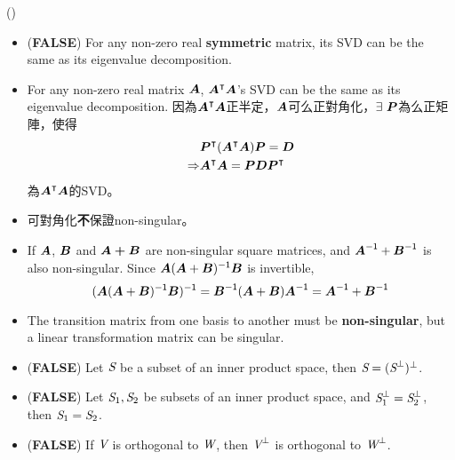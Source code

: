\item \begin{theorem}{()} \quad\quad \begin{itemize}
        \item (\textbf{FALSE}) For any non-zero real \textbf{symmetric} matrix, its SVD can be the same as its eigenvalue decomposition.
        \item For any non-zero real matrix $\boldsymbol{A}$, $\boldsymbol{A}^\intercal\boldsymbol{A}$'s SVD can be the same as its eigenvalue decomposition. 
        因為$\boldsymbol{A}^\intercal\boldsymbol{A}$正半定，$\boldsymbol{A}$可么正對角化，$\exists \ \boldsymbol{P}$為么正矩陣，使得 \begin{equation}
            \begin{aligned}
                & \boldsymbol{P}^\intercal(\boldsymbol{A}^\intercal\boldsymbol{A})\boldsymbol{P} = \boldsymbol{D} \\
                \Rightarrow & \boldsymbol{A}^\intercal\boldsymbol{A} = \boldsymbol{P}\boldsymbol{D}\boldsymbol{P}^\intercal
            \end{aligned} 
        \end{equation} 為$\boldsymbol{A}^\intercal\boldsymbol{A}$的SVD。
        \item 可對角化\textbf{不}保證non-singular。
        \item If $\boldsymbol{A}$, $\boldsymbol{B}$ and $\boldsymbol{A + B}$ are non-singular square matrices, and $\boldsymbol{A}^{\mathsf{-1}} + \boldsymbol{B}^{\mathsf{-1}}$ is also non-singular.
        Since $\boldsymbol{A}(\boldsymbol{A} + \boldsymbol{B})^{\mathsf{-1}}\boldsymbol{B}$ is invertible, \begin{equation}
            (\boldsymbol{A}(\boldsymbol{A} + \boldsymbol{B})^{\mathsf{-1}}\boldsymbol{B})^{\mathsf{-1}} = \boldsymbol{B}^{\mathsf{-1}}(\boldsymbol{A} + \boldsymbol{B})\boldsymbol{A}^{\mathsf{-1}} = \boldsymbol{A}^{\mathsf{-1}} + \boldsymbol{B}^{\mathsf{-1}}
        \end{equation}
        \item The transition matrix from one basis to another must be \textbf{non-singular}, but a linear transformation matrix can be singular.
        \item (\textbf{FALSE}) Let $\textit{S}$ be a subset of an inner product space, then $\textit{S} = (\textit{S}^{\bot})^{\bot}$.
        \item (\textbf{FALSE}) Let $\textit{S}_1, \textit{S}_2$ be subsets of an inner product space, and $\textit{S}_1^{\bot} = \textit{S}_2^{\bot}$, then $\textit{S}_1 = \textit{S}_2$.
        \item (\textbf{FALSE}) If $\textit{V}$ is orthogonal to $\textit{W}$, then $\textit{V}^\bot$ is orthogonal to $\textit{W}^\bot$.
    \end{itemize}
\end{theorem}
